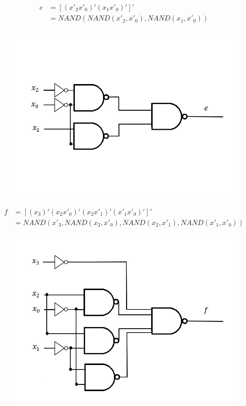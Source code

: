\documentclass{article}
\begin{document}
\begin{equation*}
\begin{split}
e & = [ (x'_2 x'_0)' (x_1 x'_0)' ]' \\ 
  & = NAND(NAND(x'_2, x'_0), NAND(x_1, x'_0)) \\
\end{split}
\end{equation*}
\begin{figure}[h!]
\centering
\includegraphics[scale=0.25]{e-NAND-NAND}
\end{figure}


\begin{equation*}
\begin{split}
f & = [ (x_3)' (x_2 x'_0)' (x_2 x'_1)' (x'_1 x'_0)' ]' \\ 
  & = NAND(x'_3, NAND(x_2, x'_0), NAND(x_2, x'_1), NAND(x'_1, x'_0)) \\
\end{split}
\end{equation*}
\begin{figure}[h!]
\centering
\includegraphics[scale=0.25]{f-NAND-NAND}
\end{figure}
\end{document}
